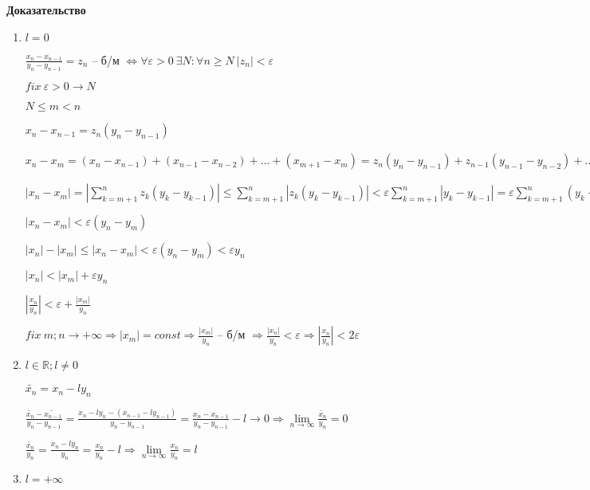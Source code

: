 \documentclass[14pt, letter paper]{article}
\begin{document}
\begin{center}
    \textbf{Доказательство}
\end{center}

\begin{enumerate}
    \item $l = 0$

    $\frac{x_n-x_{n-1}}{y_n-y_{n-1}} = z_n$ -- б/м $\Leftrightarrow \forall \varepsilon > 0\ \exists N : \forall n \geq N\ |z_n| < \varepsilon$

    $fix\ \varepsilon > 0 \rightarrow N$

    $N \leq m < n$

    $x_n - x_{n-1} = z_n(y_n - y_{n-1})$

    $x_n - x_m = (x_n - x_{n-1}) + (x_{n-1} - x_{n-2}) + \ldots + (x_{m+1} - x_m) = z_n(y_n - y_{n-1}) + z_{n-1}(y_{n-1} - y_{n-2}) + \ldots + z_{m+1}(y_{m+1} - y_m)$

    $|x_n - x_m| = |\sum\limits_{k=m+1}^n z_k(y_k - y_{k-1})| \leq \sum\limits_{k=m+1}^n |z_k(y_k-y_{k-1})| < \varepsilon \sum\limits_{k=m+1}^n |y_k - y_{k-1}| = \varepsilon \sum\limits_{k=m+1}^n (y_k - y_{k-1}) = \varepsilon(y_n - y_m)$

    $|x_n - x_m| < \varepsilon(y_n - y_m)$

    $|x_n| - |x_m| \leq |x_n - x_m| < \varepsilon(y_n - y_m) < \varepsilon y_n$

    $|x_n| < |x_m| + \varepsilon y_n$

    $|\frac{x_n}{y_n}| < \varepsilon + \frac{|x_m|}{y_n}$

    $fix\ m; n \rightarrow + \infty \Rightarrow |x_m| = const \Rightarrow \frac{|x_m|}{y_n}$ -- б/м $\Rightarrow \frac{|x_n|}{y_n} < \varepsilon \Rightarrow |\frac{x_n}{y_n}| < 2 \varepsilon$

    \item $l \in \mathds{R}; l \neq 0$

    $\tilde{x_n} = x_n - l y_n$

    $\frac{\tilde{x_n} - \tilde{x_{n-1}}}{y_n - y_{n-1}} = \frac{x_n - l y_n - (x_{n-1} - l y_{n-1})}{y_n - y_{n-1}} = \frac{x_n - x_{n-1}}{y_n - y_{n-1}} - l \rightarrow 0 \Rightarrow \lim\limits_{n \rightarrow \infty}{\frac{\tilde{x_n}}{y_n}} = 0$

    $\frac{\tilde{x_n}}{y_n} = \frac{x_n - l y_n}{y_n} = \frac{x_n}{y_n} - l \Rightarrow \lim\limits_{n \rightarrow \infty}{\frac{x_n}{y_n}} = l$

    \item $l = + \infty$


\end{enumerate}
\end{document}
